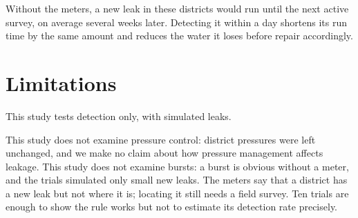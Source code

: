 \documentclass{article}
\begin{document}
Without the meters, a new leak in these districts would run until the next
active survey, on average several weeks later. Detecting it within a day
shortens its run time by the same amount and reduces the water it loses before
repair accordingly.

\section{Limitations}
\label{sec:limitations}

This study tests detection only, with simulated leaks.

This study does not examine pressure control: district pressures were left
unchanged, and we make no claim about how pressure management affects leakage.
This study does not examine bursts: a burst is obvious without a meter, and the
trials simulated only small new leaks. The meters say that a district has a new
leak but not where it is; locating it still needs a field survey. Ten trials
are enough to show the rule works but not to estimate its detection rate
precisely.
\end{document}
